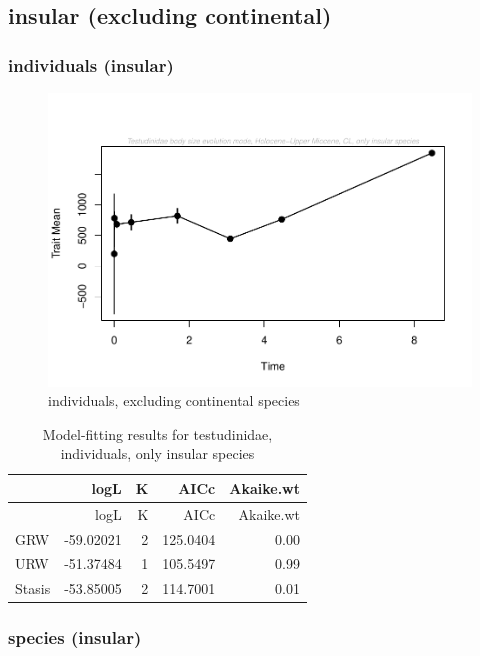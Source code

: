 \documentclass[]{article}
\begin{document}
\newpage

\subsection{insular (excluding
continental)}\label{insular-excluding-continental}

\subsubsection{individuals (insular)}\label{individuals-insular}

\begin{figure}[htbp]
\centering
\includegraphics{MA_JJ_files/figure-latex/paleoTS, individuals, exluding continental species-1.pdf}
\caption{individuals, excluding continental species}
\end{figure}

\begin{longtable}[]{@{}lrrrr@{}}
\caption{Model-fitting results for testudinidae, individuals, only
insular species}\tabularnewline
\toprule
& logL & K & AICc & Akaike.wt\tabularnewline
\midrule
\endfirsthead
\toprule
& logL & K & AICc & Akaike.wt\tabularnewline
\midrule
\endhead
GRW & -59.02021 & 2 & 125.0404 & 0.00\tabularnewline
URW & -51.37484 & 1 & 105.5497 & 0.99\tabularnewline
Stasis & -53.85005 & 2 & 114.7001 & 0.01\tabularnewline
\bottomrule
\end{longtable}

\newpage

\subsubsection{species (insular)}\label{species-insular}
\end{document}
